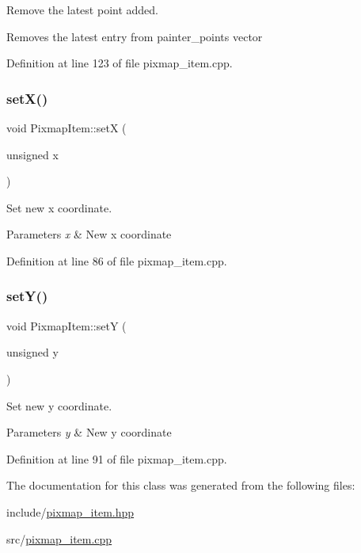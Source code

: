 Remove the latest point added. 

Removes the latest entry from painter\+\_\+points vector 

Definition at line 123 of file pixmap\+\_\+item.\+cpp.

\mbox{\label{classPixmapItem_a692a0aca72ffbe102769fdc9246ed2f6}} 
\subsubsection{\texorpdfstring{set\+X()}{setX()}}
{\footnotesize\ttfamily void Pixmap\+Item\+::setX (\begin{DoxyParamCaption}\item[{unsigned}]{x }\end{DoxyParamCaption})}



Set new x coordinate. 


\begin{DoxyParams}{Parameters}
{\em x} & New x coordinate \\
\hline
\end{DoxyParams}


Definition at line 86 of file pixmap\+\_\+item.\+cpp.

\mbox{\label{classPixmapItem_a6c6f4a872823f585edcf134d9bf209e1}} 
\subsubsection{\texorpdfstring{set\+Y()}{setY()}}
{\footnotesize\ttfamily void Pixmap\+Item\+::setY (\begin{DoxyParamCaption}\item[{unsigned}]{y }\end{DoxyParamCaption})}



Set new y coordinate. 


\begin{DoxyParams}{Parameters}
{\em y} & New y coordinate \\
\hline
\end{DoxyParams}


Definition at line 91 of file pixmap\+\_\+item.\+cpp.



The documentation for this class was generated from the following files\+:\begin{DoxyCompactItemize}
\item 
include/\mbox{\hyperlink{pixmap__item_8hpp}{pixmap\+\_\+item.\+hpp}}\item 
src/\mbox{\hyperlink{pixmap__item_8cpp}{pixmap\+\_\+item.\+cpp}}\end{DoxyCompactItemize}
